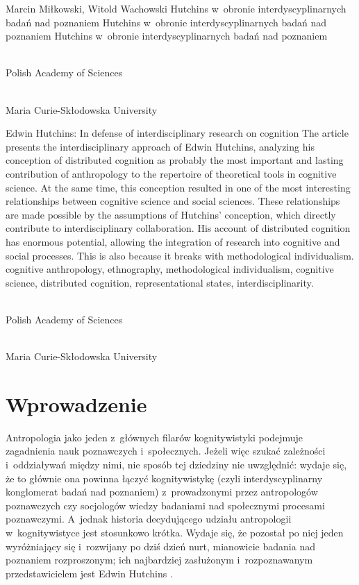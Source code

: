 \begin{artplenv2auth}{Marcin Miłkowski, Witold Wachowski}
	{Hutchins w~obronie interdyscyplinarnych badań nad poznaniem}
	{Hutchins w~obronie interdyscyplinarnych badań nad poznaniem}
	{Hutchins w~obronie interdyscyplinarnych badań nad poznaniem}
	{\flushright{}\\\subsubsectit\small{Polish Academy of Sciences}\par
		\flushright{}\\\subsubsectit\small{Maria Curie-Skłodowska University}\par}
	{Edwin Hutchins: In defense of interdisciplinary research on cognition}
	{The article presents the interdisciplinary approach of Edwin Hutchins, analyzing his conception of distributed cognition as probably the most important and lasting contribution of anthropology to the repertoire of theoretical tools in cognitive science. At the same time, this conception resulted in one of the most interesting relationships between cognitive science and social sciences. These relationships are made possible by the assumptions of Hutchins' conception, which directly contribute to interdisciplinary collaboration. His account of distributed cognition has enormous potential, allowing the integration of research into cognitive and social processes. This is also because it breaks with methodological individualism.}
	{cognitive anthropology, ethnography, methodological individualism, cognitive science, distributed cognition, representational states, interdisciplinarity.}
		{\flushright{}\\\subsubsectit\small{Polish Academy of Sciences}\par
			\flushright{}\\\subsubsectit\small{Maria Curie-Skłodowska University}\par}
	
	


\section{Wprowadzenie}
\lettrine[loversize=0.13,lines=2,lraise=-0.01,nindent=0em,findent=0.2pt]%
{A}{}ntropologia jako jeden z~głównych filarów kognitywistyki podejmuje zagadnienia nauk poznawczych i~społecznych. Jeżeli więc szukać zależności i~oddziaływań między nimi, nie sposób tej dziedziny nie uwzględnić: wydaje się, że to głównie ona powinna łączyć kognitywistykę (czyli interdyscyplinarny konglomerat badań nad poznaniem) z~prowadzonymi przez antropologów poznawczych czy socjologów wiedzy badaniami nad społecznymi procesami poznawczymi. A~jednak historia decydującego udziału antropologii w~kognitywistyce jest stosunkowo krótka. Wydaje się, że pozostał po niej jeden wyróżniający się i~rozwijany po dziś dzień nurt, mianowicie badania nad poznaniem rozproszonym; ich najbardziej zasłużonym i~rozpoznawanym przedstawicielem jest Edwin Hutchins
\parencite*[][]{hutchins_hutchins_2022}.%





\end{artplenv2auth}

